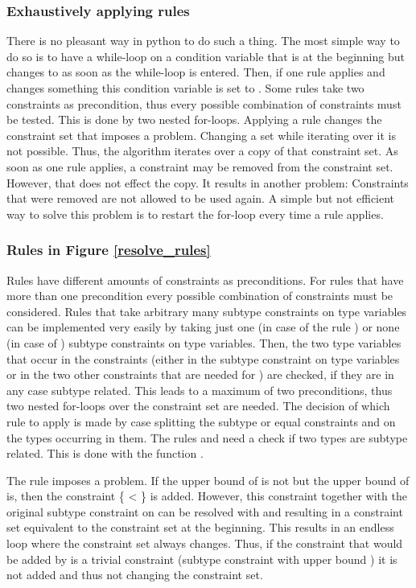 \subsubsection{Exhaustively applying rules}
There is no pleasant way in python to do such a thing. The most simple way to do so is to have a while-loop on a condition variable  that is  at the beginning but changes to  as soon as the while-loop is entered. Then, if one rule applies and changes something this condition variable is set to .
Some rules take two constraints as precondition, thus every possible combination of constraints must be tested. This is done by two nested for-loops.
Applying a rule changes the constraint set that imposes a problem. Changing a set while iterating over it is not possible. Thus, the algorithm iterates over a copy of that constraint set. As soon as one rule applies, a constraint may be removed from the constraint set. However, that does not effect the copy. It results in another problem: Constraints that were removed are not allowed to be used again.
A simple but not efficient way to solve this problem is to restart the for-loop every time a rule applies.

\subsubsection{Rules in Figure \ref{resolve_rules}}
Rules have different amounts of constraints as preconditions. For rules that have more than one precondition every possible combination of constraints must be considered. Rules that take arbitrary many subtype constraints on type variables can be implemented very easily by taking just one (in case of the rule ) or none (in case of ) subtype constraints on type variables.
Then, the two type variables that occur in the constraints (either in the subtype constraint on type variables or in the two other constraints that are needed for ) are checked, if they are in any case subtype related.
This leads to a maximum of two preconditions, thus two nested for-loops over the constraint set are needed.
The decision of which rule to apply is made by case splitting the subtype or equal constraints and on the types occurring in them.
The rules  and  need a check if two types are subtype related. This is done with the function .

The rule  imposes a problem. If the upper bound of  is not  but the upper bound of  is, then the constraint \{ < \} is added. However, this constraint together with the original subtype constraint on  can be resolved with  and  resulting in a constraint set equivalent to the constraint set at the beginning.
This results in an endless loop where the constraint set always changes. Thus, if the constraint that would be added by  is a trivial constraint (subtype constraint with upper bound ) it is not added and thus not changing the constraint set.

